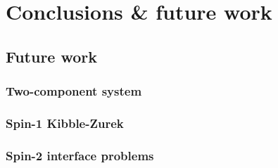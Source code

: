 \chapter{Conclusions \& future work}

\section{Future work}

\subsection{Two-component system}

\subsection{Spin-1 Kibble-Zurek}

\subsection{Spin-2 interface problems}

